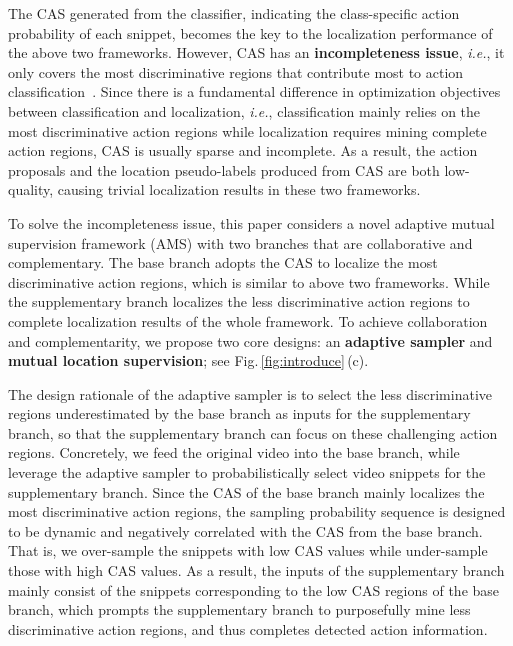 \documentclass[journal]{IEEEtran}
\begin{document}
The CAS generated from the classifier, indicating the class-specific action probability of each snippet, becomes the key to the localization performance of the above two frameworks. However, CAS has an \textbf{incompleteness issue}, \emph{i.e.}, it only covers the most discriminative regions that contribute most to action classification~\cite{zeng2019breaking,su2018cascaded,liu2019completeness}. Since there is a fundamental difference in optimization objectives between classification and localization, \emph{i.e.}, classification mainly relies on the most discriminative action regions while localization requires mining complete action regions, CAS is usually sparse and incomplete. As a result, the action proposals and the location pseudo-labels produced from CAS are both low-quality, causing trivial localization results in these two frameworks.



To solve the incompleteness issue, this paper considers a novel adaptive mutual supervision framework (AMS) with two branches that are collaborative and complementary. The base branch adopts the CAS to localize the most discriminative action regions, which is similar to above two frameworks. While the supplementary branch localizes the less discriminative action regions to complete localization results of the whole framework. To achieve collaboration and complementarity, we propose two core designs: an \textbf{adaptive sampler} and \textbf{mutual location supervision}; see Fig.\,\ref{fig:introduce}\,(c). 



The design rationale of the adaptive sampler is to select the less discriminative regions underestimated by the base branch as inputs for the supplementary branch, so that the supplementary branch can focus on these challenging action regions. Concretely, we feed the original video into the base branch, while leverage the adaptive sampler to probabilistically select video snippets for the supplementary branch. Since the CAS of the base branch mainly localizes the most discriminative action regions, the sampling probability sequence is designed to be dynamic and negatively correlated with the CAS from the base branch. That is, we over-sample the snippets with low CAS values while under-sample those with high CAS values. As a result, the inputs of the supplementary branch mainly consist of the snippets corresponding to the low CAS regions of the base branch, which prompts the supplementary branch to purposefully mine less discriminative action regions, and thus completes detected action information.
\end{document}
